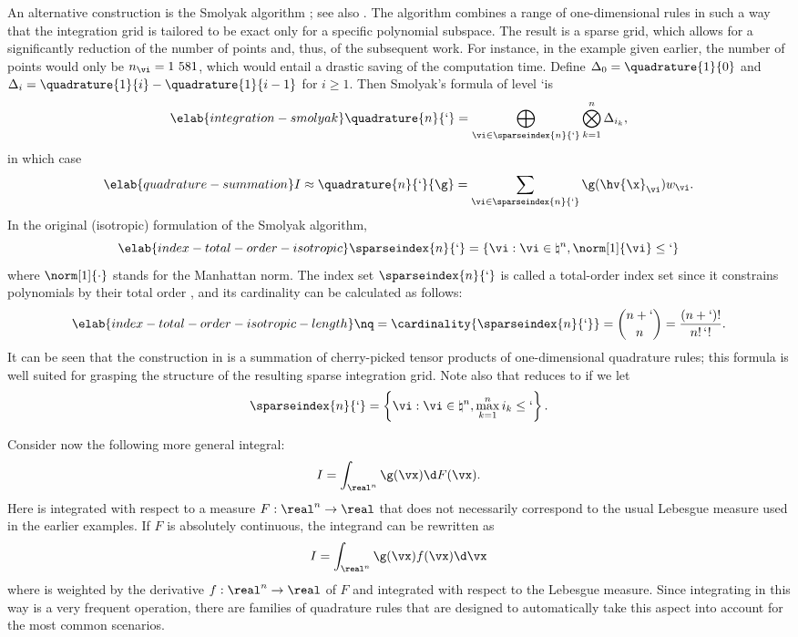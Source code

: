 An alternative construction is the Smolyak algorithm \cite{smolyak1963}; see
also \cite{eldred2008, heiss2008, maitre2010}. The algorithm combines a range of
one-dimensional rules in such a way that the integration grid is tailored to be
exact only for a specific polynomial subspace. The result is a sparse grid,
which allows for a significantly reduction of the number of points and, thus, of
the subsequent work. For instance, in the example given earlier, the number of
points would only be $n_{\vi} = 1~581$, which would entail a drastic saving of
the computation time. Define $\Delta_0 = \quadrature{1}{0}$ and $\Delta_i =
\quadrature{1}{i} - \quadrature{1}{i - 1}$ for $i \geq 1$. Then Smolyak's
formula of level \lq is
\begin{equation} \elab{integration-smolyak}
  \quadrature{n}{\lq} = \bigoplus_{\vi \in \sparseindex{n}{\lq}} \bigotimes_{k = 1}^n \Delta_{i_k},
\end{equation}
in which case
\begin{equation} \elab{quadrature-summation}
  I \approx \quadrature{n}{\lq}{\g} = \sum_{\vi \in \sparseindex{n}{\lq}} \g(\hv{\x}_{\vi}) w_{\vi}.
\end{equation}
In the original (isotropic) formulation of the Smolyak algorithm,
\begin{equation} \elab{index-total-order-isotropic}
  \sparseindex{n}{\lq} = \left\{ \vi: \vi \in \natural^n, \norm[1]{\vi} \leq \lq \right\}
\end{equation}
where $\norm[1]{\cdot}$ stands for the Manhattan norm. The index set
$\sparseindex{n}{\lq}$ is called a total-order index set since it constrains
polynomials by their total order \cite{eldred2008, beck2011}, and its
cardinality can be calculated as follows:
\begin{equation} \elab{index-total-order-isotropic-length}
  \nq = \cardinality{\sparseindex{n}{\lq}} = {n + \lq \choose n} = \frac{(n + \lq)!}{n! \, \lq!}.
\end{equation}
It can be seen that the construction in  is a
summation of cherry-picked tensor products of one-dimensional quadrature rules;
this formula is well suited for grasping the structure of the resulting sparse
integration grid. Note also that  reduces to
 if we let
\[
  \sparseindex{n}{\lq} = \left\{ \vi: \vi \in \natural^n, \max_{k = 1}^n i_k \leq \lq \right\}.
\]

Consider now the following more general integral:
\[
  I = \int_{\real^n} \g(\vx) \d F(\vx).
\]
Here \g is integrated with respect to a measure $F: \real^n \to \real$
\cite{durrett2010} that does not necessarily correspond to the usual Lebesgue
measure used in the earlier examples. If $F$ is absolutely continuous, the
integrand can be rewritten as
\[
  I = \int_{\real^n} \g(\vx) f(\vx) \d \vx
\]
where \g is weighted by the derivative $f: \real^n \to \real$ of $F$ and
integrated with respect to the Lebesgue measure. Since integrating in this way
is a very frequent operation, there are families of quadrature rules that are
designed to automatically take this aspect into account for the most common
scenarios.

